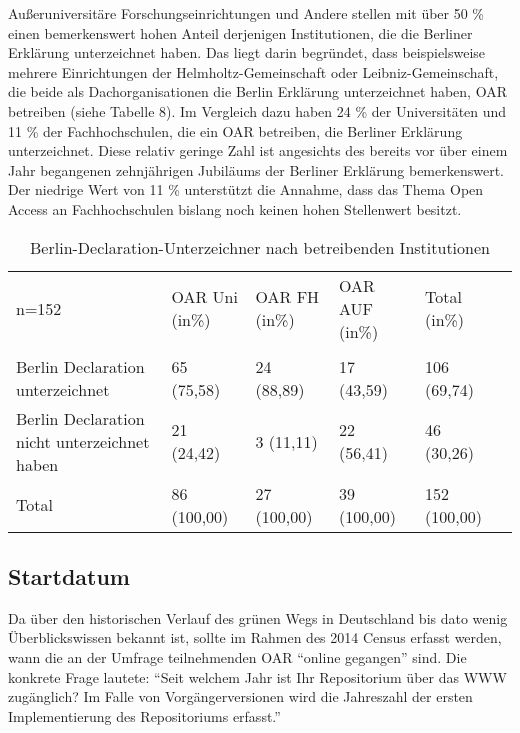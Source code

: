 \documentclass[a4paper,
fontsize=11pt,
oneside,
numbers=noperiodatend,
parskip=half-,
bibliography=totoc,
final
]{scrartcl}
\begin{document}
Außeruniversitäre Forschungseinrichtungen und Andere stellen mit über 50
\% einen bemerkenswert hohen Anteil derjenigen Institutionen, die die
Berliner Erklärung unterzeichnet haben. Das liegt darin begründet, dass
beispielsweise mehrere Einrichtungen der Helmholtz-Gemeinschaft oder
Leibniz-Gemeinschaft, die beide als Dachorganisationen die Berlin
Erklärung unterzeichnet haben, OAR betreiben (siehe Tabelle 8). Im
Vergleich dazu haben 24 \% der Universitäten und 11 \% der
Fachhochschulen, die ein OAR betreiben, die Berliner Erklärung
unterzeichnet. Diese relativ geringe Zahl ist angesichts des bereits vor
über einem Jahr begangenen zehnjährigen Jubiläums der Berliner Erklärung
bemerkenswert. Der niedrige Wert von 11 \% unterstützt die Annahme, dass
das Thema Open Access an Fachhochschulen bislang noch keinen hohen
Stellenwert besitzt.

\begin{table}[ht]
\centering
\begin{tabular}{p{3cm} lllll}
  \toprule
n=152 & OAR Uni (in\%)   & OAR FH (in\%)  & OAR AUF (in\%)  & Total (in\%) \\  
\cmidrule(r){1-1} \cmidrule(r){2-2} \cmidrule(r){3-3} \cmidrule(r){4-4} \cmidrule(r){5-5} \\ 
 Berlin Declaration unterzeichnet & 65 (75,58) & 24 (88,89) & 17 (43,59) & 106 (69,74) \\ 
Berlin Declaration nicht unterzeichnet haben & 21 (24,42) & 3 (11,11) & 22 (56,41) & 46 (30,26)  \\ 
\cmidrule(r){1-1} \cmidrule(r){2-2} \cmidrule(r){3-3} \cmidrule(r){4-4} \cmidrule(r){5-5}  
Total & 86 (100,00) & 27 (100,00) & 39 (100,00) & 152 (100,00) \\
\bottomrule
  \end{tabular}
  \caption{Berlin-Declaration-Unterzeichner nach betreibenden
Institutionen}
\end{table}

\subsection*{Startdatum}\label{Startdatum}

Da über den historischen Verlauf des grünen Wegs in Deutschland bis dato
wenig Überblickswissen bekannt ist, sollte im Rahmen des 2014 Census
erfasst werden, wann die an der Umfrage teilnehmenden OAR
\enquote{online gegangen} sind. Die konkrete Frage lautete:
\enquote{Seit welchem Jahr ist Ihr Repositorium über das WWW zugänglich?
Im Falle von Vorgängerversionen wird die Jahreszahl der ersten
Implementierung des Repositoriums erfasst.}
\end{document}
